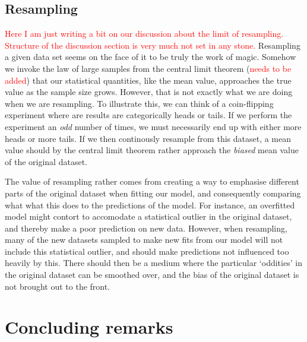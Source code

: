 \documentclass[twocolumn,english,notitlepage]{article}
\newcommand{\comment}[1]{\textcolor{red}{#1}}
\begin{document}
    \subsection{Resampling}
        \comment{Here I am just writing a bit on our discussion about the limit of resampling. Structure of the discussion section is very much not set in any stone.}
        Resampling a given data set seems on the face of it to be truly the work of magic. Somehow we invoke the law of large samples from the central limit theorem (\comment{needs to be added}) that our statistical quantities, like the mean value, approaches the true value as the sample size grows. However, that is not exactly what we are doing when we are resampling. To illustrate this, we can think of a coin-flipping experiment where are results are categorically heads or tails. If we perform the experiment an \textit{odd} number of times, we must necessarily end up with either more heads or more tails. If we then continously resample from this dataset, a mean value should by the central limit theorem rather approach the \textit{biased} mean value of the original dataset.

        The value of resampling rather comes from creating a way to emphasise different parts of the original dataset when fitting our model, and consequently comparing what what this does to the predictions of the model. For instance, an overfitted model might contort to accomodate a statistical outlier in the original dataset, and thereby make a poor prediction on new data. However, when resampling, many of the new datasets sampled to make new fits from our model will not include this statistical outlier, and should make predictions not influenced too heavily by this. There should then be a medium where the particular `oddities' in the original dataset can be smoothed over, and the bias of the original dataset is not brought out to the front.


\section{Concluding remarks}
\end{document}
